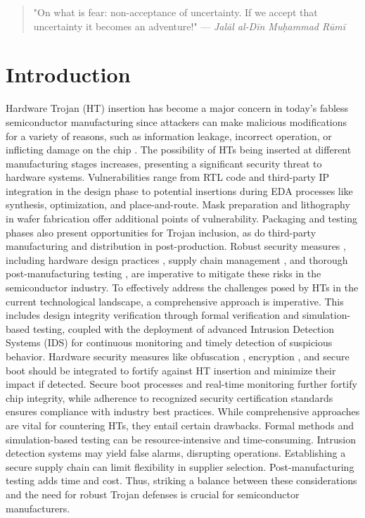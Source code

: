 \begingroup
\RaggedRight

\begin{quote}
"On what is fear: non-acceptance of uncertainty. If we accept that uncertainty it becomes an adventure!"
\newline
\hfill  — \textit{Jalāl al-Dīn Muḥammad Rūmī}
\end{quote}

\section*{Introduction}
Hardware Trojan (HT) insertion has become a major concern in today's fabless semiconductor manufacturing since attackers can make malicious modifications for a variety of reasons, such as information leakage, incorrect operation, or inflicting damage on the chip \cite{salmani2017hardware, Regazzoni:HTDetection, Guin:HTDetection, Salmani:HTDetection}. The possibility of HTs being inserted at different manufacturing stages increases, presenting a significant security threat to hardware systems. Vulnerabilities range from RTL code and third-party IP integration in the design phase to potential insertions during EDA processes like synthesis, optimization, and place-and-route. Mask preparation \cite{belous2020methods} and lithography in wafer fabrication offer additional points of vulnerability. Packaging and testing phases also present opportunities for Trojan inclusion, as do third-party manufacturing and distribution in post-production. Robust security measures \cite{narasimhan2011tesr}, including hardware design practices \cite{muralidhar2021contrastive}, supply chain management \cite{chang2023supplier, panduro2023effective}, and thorough post-manufacturing testing \cite{monjur2023hardware}, are imperative to mitigate these risks in the semiconductor industry.
To effectively address the challenges posed by HTs in the current technological landscape, a comprehensive approach is imperative. This includes design integrity verification through formal verification \cite{nahiyan2017hardware} and simulation-based testing, coupled with the deployment of advanced Intrusion Detection Systems (IDS) for continuous monitoring and timely detection of suspicious behavior. Hardware security measures like obfuscation \cite{nishita2023hardware}, encryption \cite{chandra2023efficient}, and secure boot \cite{monjur2023hardware} should be integrated to fortify against HT insertion and minimize their impact if detected. Secure boot processes \cite{monjur2023hardware} and real-time monitoring further fortify chip integrity, while adherence to recognized security certification standards ensures compliance with industry best practices. 
While comprehensive approaches are vital for countering HTs, they entail certain drawbacks. Formal methods and simulation-based testing can be resource-intensive and time-consuming. Intrusion detection systems may yield false alarms, disrupting operations. %
Establishing a secure supply chain can limit flexibility in supplier selection. Post-manufacturing testing adds time and cost. 
Thus, striking a balance between these considerations and the need for robust Trojan defenses is crucial for semiconductor manufacturers.

